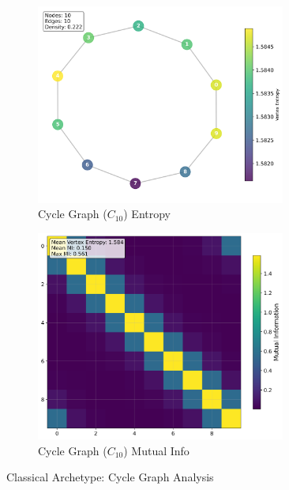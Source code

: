 \documentclass[12pt, letterpaper]{article}
\begin{document}
\begin{figure}[H]
    \centering
    \begin{subfigure}[b]{0.48\textwidth}
        \includegraphics[width=0.9\textwidth]{images/Graph Visualizations/Classical/Cycle_vertex_entropy.png}
        \caption{Cycle Graph ($C_{10}$) Entropy}
        \label{fig:cycle_entropy}
    \end{subfigure}
    \hfill
    \begin{subfigure}[b]{0.48\textwidth}
        \includegraphics[width=0.9\textwidth]{images/Graph Visualizations/Classical/Cycle_MI_Matrix.png}
        \caption{Cycle Graph ($C_{10}$) Mutual Info}
        \label{fig:cycle_mi}
    \end{subfigure}
    \caption{Classical Archetype: Cycle Graph Analysis}
    \label{fig:cycle_analysis}
\end{figure}
\end{document}
